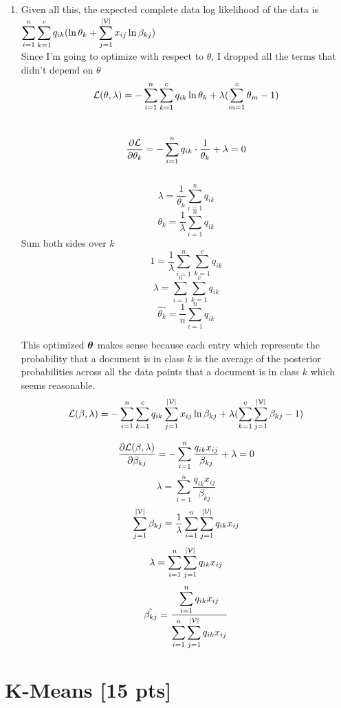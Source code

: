 \documentclass[submit]{harvardml}
\begin{document}
\begin{enumerate}
		\item Given all this, the expected complete data log likelihood of the data is $\displaystyle\sum_{i = 1}^{n}\sum_{k = 1}^{c}q_{ik}(\ln\theta_k + \sum_{j = 1}^{|\mathcal{V}|}x_{ij}\ln\beta_{kj})$ \\
		
		Since I'm going to optimize with respect to $\theta$, I dropped all the terms that didn't depend on $\theta$ \\
		\[\mathcal{L}(\theta,\lambda) = -\displaystyle\sum_{i = 1}^{n}\sum_{k = 1}^{c}q_{ik}\ln\theta_k + \lambda(\sum_{m=1}^{c}\theta_m - 1)\] \\
		\[ \dfrac{\partial\mathcal{L}}{\partial\theta_k} = - \sum_{i=1}^{n}q_{ik}\cdot\frac{1}{\theta_k} + \lambda = 0 \] \\
		\[ \lambda = \dfrac{1}{\theta_k}\sum_{i =1}^{n}q_{ik}   \]
		\[ \theta_k = \frac{1}{\lambda}\sum_{i=1}^{n}q_{ik}\] 
		Sum both sides over $k$ \\
		\[ 1 = \frac{1}{\lambda} \sum_{i = 1}^{n}\sum_{k=1}^{c}q_{ik}\]
		\[\lambda = \sum_{i = 1}^{n}\sum_{k=1}^{c}q_{ik} \]
		\[\hat{\theta_k} = \frac{1}{n}\sum_{i = 1}^{n}q_{ik}\]
		
		This optimized $\boldsymbol{\theta}$ makes sense because each entry which represents the probability that a document is in class $k$ is the average of the posterior probabilities across all the data points that a document is in class $k$ which seems reasonable.  \\
		
		\[\mathcal{L}(\beta, \lambda) = -\sum_{i = 1}^n\sum_{k = 1}^{c}q_{ik}\sum_{j = 1}^{|\mathcal{V}|}x_{ij}\ln\beta_{kj} + \lambda(\sum_{k = 1}^{c}\sum_{j = 1}^{|\mathcal{V}|}\beta_{kj} - 1) \]
		
		\[\dfrac{\partial\mathcal{L}(\beta,\lambda)}{\partial\beta_{kj}} = -\sum_{i=1}^{n}\dfrac{q_{ik}x_{ij}}{\beta_{kj}} + \lambda = 0\]
		\[\lambda = \sum_{i = 1}^{n}\dfrac{q_{ik}x_{ij}}{\beta_{kj}}   \] 
		\[\sum_{j = 1}^{|\mathcal{V}|}\beta_{kj} = \frac{1}{\lambda} \sum_{i=1}^{n}\sum_{j = 1}^{|\mathcal{V}|}q_{ik}x_{ij} \]
		\[\lambda = \sum_{i=1}^{n}\sum_{j = 1}^{|\mathcal{V}|} q_{ik}x_{ij}\]
		\[\hat{\beta_{kj}} = \dfrac{\displaystyle\sum_{i = 1}^{n}q_{ik}x_{ij}}{\displaystyle\sum_{i=1}^{n}\sum_{j = 1}^{|\mathcal{V}|}q_{ik}x_{ij}}\]
	\end{enumerate}
	
	
	\newpage
	
	\section*{K-Means [15 pts]}
	
\end{document}
